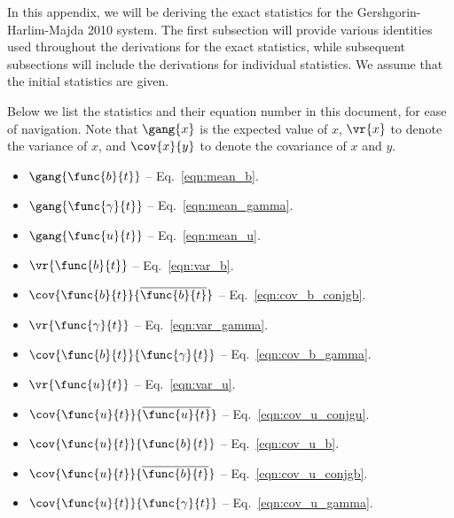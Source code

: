 In this appendix, we will be deriving the exact statistics for the Gershgorin-Harlim-Majda 2010 system. The first subsection will provide various identities used throughout the derivations for the exact statistics, while subsequent subsections will include the derivations for individual statistics. We assume that the initial statistics are given.

Below we list the statistics and their equation number in this document, for ease of navigation. Note that $\gang{x}$ is the expected value of $x$, $\vr{x}$ to denote the variance of $x$, and $\cov{x}{y}$ to denote the covariance of $x$ and $y$.

\begin{itemize}
	\item [] $\gang{\func{b}{t}}$ -- Eq.~\ref{eqn:mean_b}. 
	\item [] $\gang{\func{\gamma}{t}}$ -- Eq.~\ref{eqn:mean_gamma}.
	\item [] $\gang{\func{u}{t}}$ -- Eq.~\ref{eqn:mean_u}.
	\item [] $\vr{\func{b}{t}}$ -- Eq.~\ref{eqn:var_b}.
	\item [] $\cov{\func{b}{t}}{\overline{\func{b}{t}}}$ -- Eq.~\ref{eqn:cov_b_conjgb}.
	\item [] $\vr{\func{\gamma}{t}}$ -- Eq.~\ref{eqn:var_gamma}.
	\item [] $\cov{\func{b}{t}}{\func{\gamma}{t}}$ -- Eq.~\ref{eqn:cov_b_gamma}.
	\item [] $\vr{\func{u}{t}}$ -- Eq.~\ref{eqn:var_u}.
	\item [] $\cov{\func{u}{t}}{\overline{\func{u}{t}}}$ -- Eq.~\ref{eqn:cov_u_conjgu}.
	\item [] $\cov{\func{u}{t}}{\func{b}{t}}$ -- Eq.~\ref{eqn:cov_u_b}.
	\item [] $\cov{\func{u}{t}}{\overline{\func{b}{t}}}$ -- Eq.~\ref{eqn:cov_u_conjgb}.
	\item [] $\cov{\func{u}{t}}{\func{\gamma}{t}}$ -- Eq.~\ref{eqn:cov_u_gamma}.
\end{itemize}
